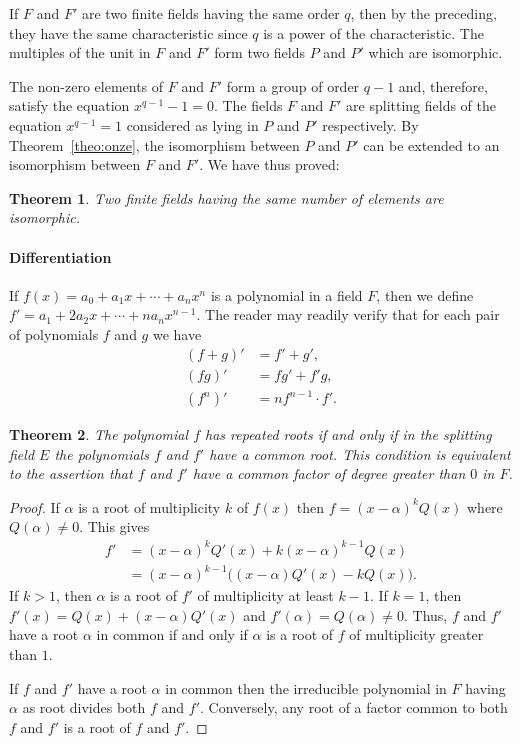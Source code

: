 \documentclass[10pt,leqno,a5paper]{book}
\newtheorem{theo}{Theorem}
\theoremstyle{definition}
\begin{document}
If $F$ and $F'$ are two finite fields having the same order $q$, then by the preceding, they have the same characteristic since $q$ is a power of the characteristic.
The multiples of the unit in $F$ and $F'$ form two fields $P$ and $P'$ which are isomorphic.

The non-zero elements of $F$ and $F'$ form a group of order $q-1$ and, therefore, satisfy the equation $x^{q-1} - 1 = 0$.
The fields $F$ and $F'$ are splitting fields of the equation $x^{q-1} = 1$ considered as lying in $P$ and $P'$ respectively.
By Theorem~\ref{theo:onze}, the isomorphism between $P$ and $P'$ can be extended to an isomorphism between $F$ and $F'$.
We have thus proved:


\begin{theo}
\label{theo:onei}
Two finite fields having the same number of elements are isomorphic.
\end{theo}



\paragraph{Differentiation}
If $f(x) = a_0 + a_1x + \cdots + a_nx^n$ is a polynomial in a field $F$, then we define $f' = a_1 + 2a_2x + \cdots + n a_n x^{n-1}$.
The reader may readily verify that for each pair of polynomials $f$ and $g$ we have
\begin{align*}
(f+g)' &= f' + g',
\\
(fg)' &= fg' + f'g,
\\
(f^n)' &= nf^{n-1} \cdot f'.
\end{align*}

\begin{theo}
\label{theo:onni}
The polynomial $f$ has repeated roots if and only if in the splitting field $E$ the polynomials $f$ and $f'$ have a common root.
This condition is equivalent to the assertion that $f$ and $f'$ have a common factor of degree greater than $0$ in $F$.
\end{theo}

\begin{proof}
If $\alpha$ is a root of multiplicity $k$ of $f(x)$ then $f = (x-\alpha)^k Q(x)$ where $Q(\alpha) \not= 0$.
This gives
\begin{align*}
f'
&= (x - \alpha)^k Q'(x) + k (x - \alpha)^{k-1} Q(x)
\\
&= (x - \alpha)^{k-1}\bigl(
(x - \alpha) Q'(x) - k Q(x)
\bigr).
\end{align*}
If $k > 1$, then $\alpha$ is a root of $f'$ of multiplicity at least $k-1$.
If $k=1$, then $f'(x) = Q(x) + (x -\alpha) Q'(x)$ and $f'(\alpha) = Q(\alpha) \not= 0$.
Thus, $f$ and $f'$ have a root $\alpha$ in common if and only if $\alpha$ is a root of $f$ of multiplicity greater than $1$.

If $f$ and $f'$ have a root $\alpha$ in common then the irreducible polynomial in $F$ having $\alpha$ as root divides both $f$ and $f'$.
Conversely, any root of a factor common to both $f$ and $f'$ is a root of $f$ and $f'$.
\end{proof}
\end{document}
